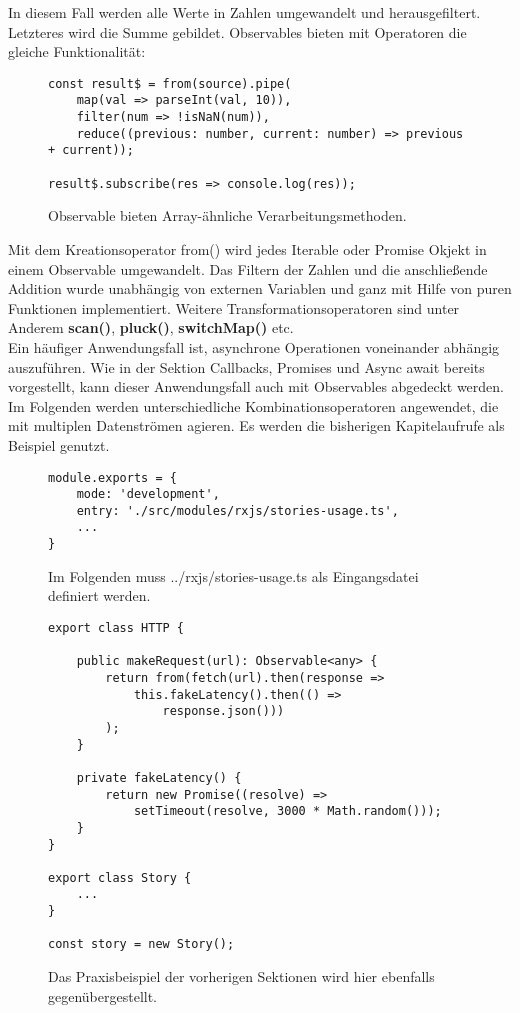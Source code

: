 \noindent
In diesem Fall werden alle Werte in Zahlen umgewandelt und herausgefiltert. Letzteres wird die Summe gebildet. Observables bieten mit Operatoren die gleiche Funktionalität:

\begin{figure}[H]
\begin{lstlisting}[basicstyle=\small]
const result$ = from(source).pipe(
    map(val => parseInt(val, 10)),
    filter(num => !isNaN(num)),
    reduce((previous: number, current: number) => previous + current));

result$.subscribe(res => console.log(res));
\end{lstlisting}
\caption{Observable bieten Array-ähnliche Verarbeitungsmethoden.}
\end{figure}

\noindent
Mit dem Kreationsoperator from() wird jedes Iterable oder Promise Okjekt in einem Observable umgewandelt. Das Filtern der Zahlen und die anschließende Addition wurde unabhängig von externen Variablen und ganz mit Hilfe von puren Funktionen implementiert. Weitere Transformationsoperatoren sind unter Anderem \textbf{scan()}, \textbf{pluck()}, \textbf{switchMap()} etc.\\

\noindent
Ein häufiger Anwendungsfall ist, asynchrone Operationen voneinander abhängig auszuführen. Wie in der Sektion Callbacks, Promises und Async await bereits vorgestellt, kann dieser Anwendungsfall auch mit Observables abgedeckt werden. Im Folgenden werden unterschiedliche Kombinationsoperatoren angewendet, die mit multiplen Datenströmen agieren. Es werden die bisherigen Kapitelaufrufe als Beispiel genutzt. 

\begin{figure}[H]
\begin{lstlisting}[basicstyle=\small]
module.exports = {
    mode: 'development',
    entry: './src/modules/rxjs/stories-usage.ts',
    ...
}
\end{lstlisting}
\caption{Im Folgenden muss ../rxjs/stories-usage.ts als Eingangsdatei definiert werden.}
\end{figure}

\begin{figure}[H]
\begin{lstlisting}[basicstyle=\small]
export class HTTP {

    public makeRequest(url): Observable<any> {
        return from(fetch(url).then(response =>
            this.fakeLatency().then(() =>
                response.json()))
        );
    }

    private fakeLatency() {
        return new Promise((resolve) =>
            setTimeout(resolve, 3000 * Math.random()));
    }
}

export class Story {
    ...
}

const story = new Story();
\end{lstlisting}
\caption{Das Praxisbeispiel der vorherigen Sektionen wird hier ebenfalls gegenübergestellt.}
\end{figure}

